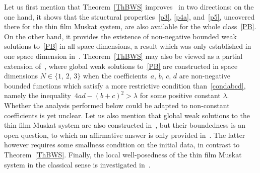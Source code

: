 \documentclass[AHL,Unicode,longabstracts,published]{cedram}
\begin{document}
Let us first mention that Theorem~\ref{ThBWS} improves~\cite{LM22} in two directions: on the one hand, it shows that the structural properties~\eqref{p3}, \eqref{p4a}, and~\eqref{p5}, uncovered there for the thin film Muskat system, are also available for the whole class~\eqref{PB}. On the other hand, it provides the existence of non-negative bounded weak solutions to~\eqref{PB} in all space dimensions, a result which was only established in one space dimension in~\cite{LM22}. Theorem~\ref{ThBWS} may also be viewed as a partial extension of~\cite{GS14}, where global weak solutions to~\eqref{PB} are constructed in space dimensions $N\in\{1,\, 2,\, 3\}$ when the coefficients~$a,\,b,\, c,\, d$ are non-negative bounded functions which satisfy a more restrictive condition than~\eqref{condabcd}, namely the inequality~${4ad-(b+c)^2>\lambda}$ for some positive constant $\lambda$. Whether the analysis performed below could be adapted to non-constant coefficients is yet unclear. Let us also mention that global weak solutions to the thin film Muskat system are also constructed in~\cite{AIJM2018, BGB2019, ELM2011, LM2013, LM2017,ACCL2019}, but their boundedness is an open question, to which an affirmative answer is only provided in~\cite{BGB2019}. The latter however requires some smallness condition on the initial data, in contrast to Theorem~\ref{ThBWS}. Finally, the local well-posedness of the thin film Muskat system in the classical sense is investigated in~\cite{EMM2012}.

\end{document}
